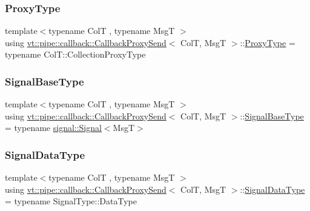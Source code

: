 \subsubsection{\texorpdfstring{Proxy\+Type}{ProxyType}}
{\footnotesize\ttfamily template$<$typename ColT , typename MsgT $>$ \\
using \hyperlink{structvt_1_1pipe_1_1callback_1_1_callback_proxy_send}{vt\+::pipe\+::callback\+::\+Callback\+Proxy\+Send}$<$ ColT, MsgT $>$\+::\hyperlink{structvt_1_1pipe_1_1callback_1_1_callback_proxy_send_a2aece7c6f8bd17a4c0b1fdca75d84579}{Proxy\+Type} =  typename Col\+T\+::\+Collection\+Proxy\+Type}

\mbox{\label{structvt_1_1pipe_1_1callback_1_1_callback_proxy_send_a29a3c5e7cc3dc714225103d1a4d8856d}} 
\subsubsection{\texorpdfstring{Signal\+Base\+Type}{SignalBaseType}}
{\footnotesize\ttfamily template$<$typename ColT , typename MsgT $>$ \\
using \hyperlink{structvt_1_1pipe_1_1callback_1_1_callback_proxy_send}{vt\+::pipe\+::callback\+::\+Callback\+Proxy\+Send}$<$ ColT, MsgT $>$\+::\hyperlink{structvt_1_1pipe_1_1callback_1_1_callback_proxy_send_a29a3c5e7cc3dc714225103d1a4d8856d}{Signal\+Base\+Type} =  typename \hyperlink{structvt_1_1pipe_1_1signal_1_1_signal}{signal\+::\+Signal}$<$MsgT$>$}

\mbox{\label{structvt_1_1pipe_1_1callback_1_1_callback_proxy_send_a2a8b17dedeb5cc2b68ca5c7386796ef3}} 
\subsubsection{\texorpdfstring{Signal\+Data\+Type}{SignalDataType}}
{\footnotesize\ttfamily template$<$typename ColT , typename MsgT $>$ \\
using \hyperlink{structvt_1_1pipe_1_1callback_1_1_callback_proxy_send}{vt\+::pipe\+::callback\+::\+Callback\+Proxy\+Send}$<$ ColT, MsgT $>$\+::\hyperlink{structvt_1_1pipe_1_1callback_1_1_callback_proxy_send_a2a8b17dedeb5cc2b68ca5c7386796ef3}{Signal\+Data\+Type} =  typename Signal\+Type\+::\+Data\+Type}

